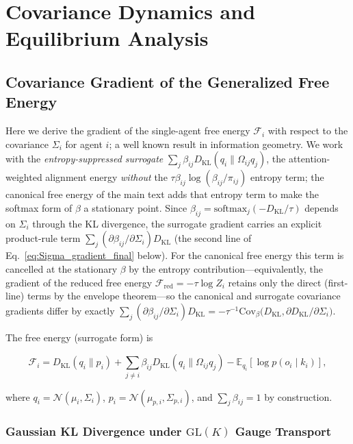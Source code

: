 \documentclass[twoside,11pt]{article}
\begin{document}
\section{Covariance Dynamics and Equilibrium Analysis}
\label{app:covariance_dynamics}

\subsection{Covariance Gradient of the Generalized Free Energy}

Here we derive the gradient of the single-agent free energy $\mathcal{F}_i$ with respect to the covariance $\Sigma_i$ for agent $i$; a well known result in information geometry. We work with the \emph{entropy-suppressed surrogate} $\sum_j \beta_{ij} D_{\mathrm{KL}}(q_i \| \Omega_{ij}q_j)$, the attention-weighted alignment energy \emph{without} the $\tau\beta_{ij}\log(\beta_{ij}/\pi_{ij})$ entropy term; the canonical free energy of the main text adds that entropy term to make the softmax form of $\beta$ a stationary point. Since $\beta_{ij} = \mathrm{softmax}_j(-D_{\mathrm{KL}}/\tau)$ depends on $\Sigma_i$ through the KL divergence, the surrogate gradient carries an explicit product-rule term $\sum_j (\partial\beta_{ij}/\partial\Sigma_i) D_{\mathrm{KL}}$ (the second line of Eq.~\eqref{eq:Sigma_gradient_final} below). For the canonical free energy this term is cancelled at the stationary $\beta$ by the entropy contribution---equivalently, the gradient of the reduced free energy $\mathcal{F}_{\mathrm{red}} = -\tau\log Z_i$ retains only the direct (first-line) terms by the envelope theorem---so the canonical and surrogate covariance gradients differ by exactly $\sum_j (\partial\beta_{ij}/\partial\Sigma_i) D_{\mathrm{KL}} = -\tau^{-1} \mathrm{Cov}_\beta\big(D_{\mathrm{KL}}, \partial D_{\mathrm{KL}}/\partial\Sigma_i\big)$.

The free energy (surrogate form) is

\begin{equation}
\mathcal{F}_i
=D_{\mathrm{KL}}(q_i \| p_i)
+ \sum_{j \neq i} \beta_{ij} 
D_{\mathrm{KL}}(q_i \| \Omega_{ij} q_j)
- \mathbb{E}_{q_i}[\log p(o_i \mid k_i)],
\end{equation}

where $q_i = \mathcal{N}(\mu_i, \Sigma_i)$, $p_i = \mathcal{N}(\mu_{p,i}, \Sigma_{p,i})$, and $\sum_j \beta_{ij} = 1$ by construction.

\subsubsection{Gaussian KL Divergence under $\mathrm{GL}(K)$ Gauge Transport}
\end{document}
